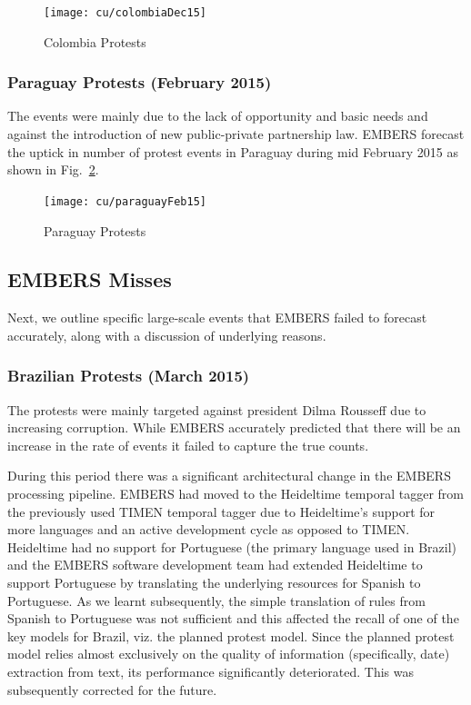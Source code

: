 \begin{figure}[H]
\centering
\texttt{[image: cu/colombiaDec15]}
\caption{Colombia Protests }
\label{fig:colombiaDec14}
\end{figure}

\subsubsection*{Paraguay Protests (February 2015)}
The events were mainly due to the lack of opportunity and basic
needs and against the introduction of new public-private partnership law.
EMBERS forecast the uptick in number of protest events in Paraguay during mid
February 2015 as shown in Fig.~\ref{fig:paraguay15}.

\begin{figure}[H]
\centering
\texttt{[image: cu/paraguayFeb15]}
\caption{Paraguay Protests }
\label{fig:paraguay15}
\end{figure}

\subsection{EMBERS Misses}
Next, we outline specific large-scale events that
EMBERS failed to forecast accurately, along with a discussion of underlying
reasons.

\subsubsection{Brazilian Protests (March 2015)}
The protests were mainly targeted against president Dilma Rousseff due to
increasing corruption.
While EMBERS accurately predicted that there
will be an increase in the rate of events it failed to
capture the true counts.

During this period there was a significant architectural change in the
EMBERS processing pipeline. EMBERS had moved to the Heideltime temporal
tagger from the previously used TIMEN temporal tagger due to
Heideltime's support for more languages and an active development cycle as
opposed to TIMEN. 
Heideltime had no support for Portuguese (the primary
language used in Brazil) and the EMBERS software development team had extended Heideltime to
support Portuguese by translating the underlying
resources for Spanish to Portuguese. As we learnt subsequently,
the simple translation of rules from Spanish to Portuguese
was not sufficient and this affected the recall of one of the key models
for Brazil, viz. the planned protest model. Since the planned protest model relies
almost exclusively on the quality of information (specifically, date) extraction from text,
its performance significantly deteriorated. This was subsequently corrected for the future.

